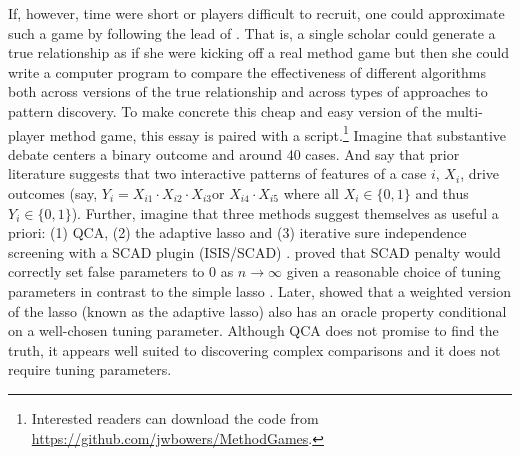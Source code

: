 \documentclass[12pt]{article}
\begin{document}
If, however, time were short or players difficult to recruit, one could
approximate such a game by following the lead of \citet{lucasfk2013}. That is,
a single scholar could generate a true relationship as if she were kicking off
a real method game but then she could write a computer program to compare the
effectiveness of different algorithms both across versions of the true
relationship and across types of approaches to pattern discovery. To make
concrete this cheap and easy version of the multi-player method game, this
essay is paired with a script.\footnote{Interested readers can download the
  code from \url{https://github.com/jwbowers/MethodGames}.} Imagine that
substantive debate centers a binary outcome and around 40 cases. And say that
prior literature suggests that two interactive patterns of features of a case
$i$, $X_i$, drive outcomes (say, $Y_i=X_{i1} \cdot X_{i2} \cdot X_{i3} \text{
  or } X_{i4} \cdot X_{i5}$ where all $X_i  \in \{0,1\}$ and thus $Y_i \in
\{0,1\}$).  Further, imagine that three methods suggest themselves as useful a
priori: (1) QCA, (2) the adaptive lasso and (3) iterative sure independence
screening with a SCAD plugin (ISIS/SCAD) \citep{fan2008sure}.
\citet{fan2001variable} proved that SCAD penalty would correctly set false
parameters to 0 as $n \rightarrow \infty$ given a reasonable choice of tuning
parameters in contrast to the simple lasso \citep{tibshirani1996regression}.
Later, \citet{zou2006adaptive} showed that a weighted version of the lasso
(known as the adaptive lasso) also has an oracle property conditional on a
well-chosen tuning parameter. Although QCA does not promise to find the truth,
it appears well suited to discovering complex comparisons and it does not
require tuning parameters.
\end{document}

